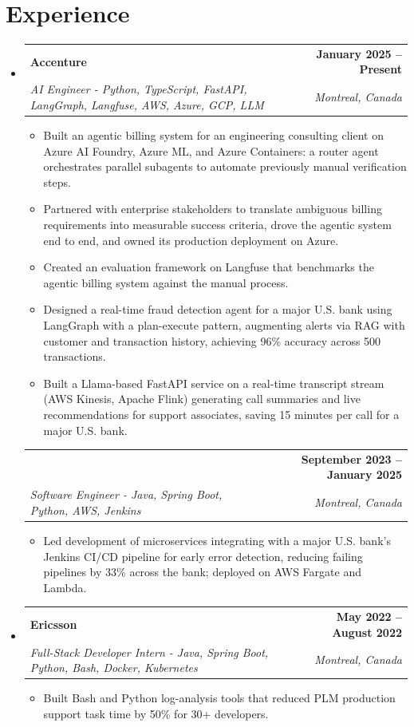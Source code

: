 \documentclass[letterpaper,11pt]{article}
\makeatletter
\newcommand{\resumeItem}[1]{
  \item\small{{#1 \vspace{-2pt}}}
}
\newcommand{\resumeSubheading}[4]{
  \vspace{-2pt}\item
    \begin{tabular*}{1.0\textwidth}[t]{l@{\extracolsep{\fill}}r}
      \textbf{#1} & \textbf{\small #2} \\
      \textit{\small#3} & \textit{\small #4} \\
    \end{tabular*}\vspace{-7pt}
}
\newcommand{\resumeSubheadingContinued}[3]{
  \vspace{4pt}
    \begin{tabular*}{1.0\textwidth}[t]{l@{\extracolsep{\fill}}r}
      & \textbf{\small #2} \\
      \textit{\small#1} & \textit{\small #3} \\
    \end{tabular*}\vspace{-7pt}
}
\newcommand{\resumeSubHeadingListStart}{\begin{itemize}[leftmargin=0.0in, label={}]}
\newcommand{\resumeSubHeadingListEnd}{\end{itemize}}
\newcommand{\resumeItemListStart}{\begin{itemize}}
\newcommand{\resumeItemListEnd}{\end{itemize}\vspace{-5pt}}
\makeatother
\begin{document}
\section{Experience}
  \resumeSubHeadingListStart

    \resumeSubheading
      {Accenture}{January 2025 -- Present}
      {AI Engineer - Python, TypeScript, FastAPI, LangGraph, Langfuse, AWS, Azure, GCP, LLM}{Montreal, Canada}
      \resumeItemListStart
        \resumeItem{Built an agentic billing system for an engineering consulting client on Azure AI Foundry, Azure ML, and Azure Containers: a router agent orchestrates parallel subagents to automate previously manual verification steps.}
        \resumeItem{Partnered with enterprise stakeholders to translate ambiguous billing requirements into measurable success criteria, drove the agentic system end to end, and owned its production deployment on Azure.}
        \resumeItem{Created an evaluation framework on Langfuse that benchmarks the agentic billing system against the manual process.}
        \resumeItem{Designed a real-time fraud detection agent for a major U.S. bank using LangGraph with a plan-execute pattern, augmenting alerts via RAG with customer and transaction history, achieving 96\% accuracy across 500 transactions.}
        \resumeItem{Built a Llama-based FastAPI service on a real-time transcript stream (AWS Kinesis, Apache Flink) generating call summaries and live recommendations for support associates, saving 15 minutes per call for a major U.S. bank.}
      \resumeItemListEnd
      \vspace{-2pt}

    \resumeSubheadingContinued
      {Software Engineer - Java, Spring Boot, Python, AWS, Jenkins}{September 2023 -- January 2025}{Montreal, Canada}
      \resumeItemListStart
        \resumeItem{Led development of microservices integrating with a major U.S. bank's Jenkins CI/CD pipeline for early error detection, reducing failing pipelines by 33\% across the bank; deployed on AWS Fargate and Lambda.}
      \resumeItemListEnd

    \resumeSubheading
      {Ericsson}{May 2022 -- August 2022}
      {Full-Stack Developer Intern - Java, Spring Boot, Python, Bash, Docker, Kubernetes}{Montreal, Canada}
      \resumeItemListStart
        \resumeItem{Built Bash and Python log-analysis tools that reduced PLM production support task time by 50\% for 30+ developers.}
      \resumeItemListEnd

  \resumeSubHeadingListEnd
\vspace{-14pt}
\end{document}
